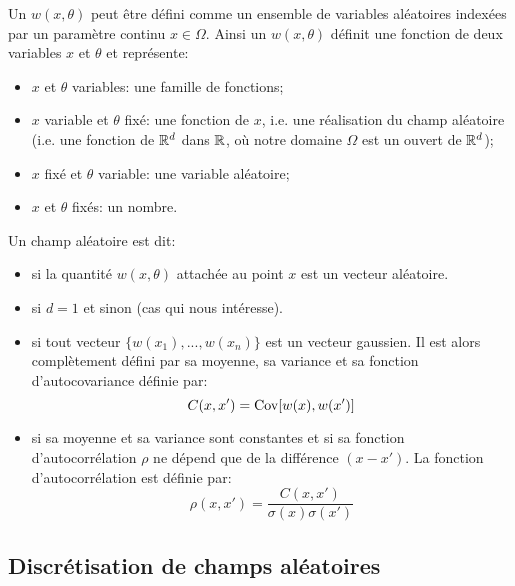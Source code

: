 \begin{definition}
Un  $w(x,\theta)$ peut être défini comme un ensemble de variables aléatoires indexées par un paramètre continu $x\in\Omega$.
Ainsi un  $w(x,\theta)$ définit une fonction de deux variables $x$ et $\theta$ et représente:
\begin{itemize}
   \item $x$ et $\theta$ variables: une famille de fonctions;
   \item $x$ variable et $\theta$ fixé: une fonction de $x$, i.e. une réalisation du champ aléatoire (i.e. une fonction de $\mathbb R^d$ dans $\mathbb R$, où notre domaine $\Omega$ est un ouvert de $\mathbb R^d$);
   \item $x$ fixé et $\theta$ variable: une variable aléatoire;
   \item $x$ et $\theta$ fixés: un nombre.
\end{itemize}
\end{definition}
Un champ aléatoire est dit:
\begin{itemize}
   \item {} si la quantité $w(x,\theta)$ attachée au point $x$ est un vecteur aléatoire.
   \item {} si $d=1$ et  sinon (cas qui nous intéresse).
   \item {} si tout vecteur $\{w(x_1), ..., w(x_n)\}$ est un vecteur gaussien. Il est alors complètement défini par sa moyenne, sa variance et sa fonction d'autocovariance définie par:
   \begin{equation}
       C(x,x')=\operatorname{Cov}[w(x),w(x')]
   \end{equation}
   \item {} si sa moyenne et sa variance sont constantes et si sa fonction d'autocorrélation $\rho$ ne dépend que de la différence $(x-x')$. La fonction d'autocorrélation est définie par: 
   \begin{equation}
      \rho(x,x')=\dfrac{C(x,x')}{\sigma(x)\sigma(x')}
   \end{equation}
\end{itemize}

\medskip
\subsection{Discrétisation de champs aléatoires}


